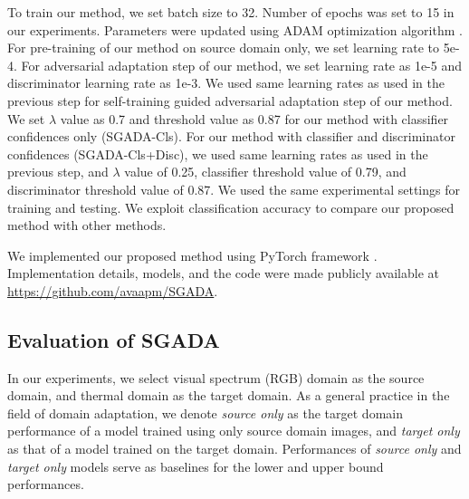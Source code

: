 \documentclass[final]{cvpr}
\begin{document}
To train our method, we set batch size to 32. Number of epochs was set to 15 in our experiments. Parameters were updated using ADAM optimization algorithm \cite{adam}. For pre-training of our method on source domain only, we set learning rate to 5e-4. For adversarial adaptation step of our method, we set learning rate as 1e-5 and discriminator learning rate as 1e-3. We used same learning rates as used in the previous step for self-training guided adversarial adaptation step of our method. We set $ \lambda $ value as 0.7 and threshold value as 0.87 for our method with classifier confidences only (SGADA-Cls). For our method with classifier and discriminator confidences (SGADA-Cls+Disc), we used same learning rates as used in the previous step, and $ \lambda $ value of 0.25, classifier threshold value of 0.79, and discriminator threshold value of 0.87. We used the same experimental settings for training and testing. We exploit classification accuracy to compare our proposed method with other methods.
\vspace{2mm}

We implemented our proposed method using PyTorch framework \cite{pytorch}. Implementation details, models, and the code were made publicly available at \href{https://github.com/avaapm/SGADA}{https://github.com/avaapm/SGADA}.

\subsection{Evaluation of SGADA}

In our experiments, we select visual spectrum (RGB) domain as the source domain, and thermal domain as the target domain. As a general practice in the field of domain adaptation, we denote \textit{source only} as the target domain performance of a model trained using only source domain images, and \textit{target only} as that of a model trained on the target domain. Performances of \textit{source only} and \textit{target only} models serve as baselines for the lower and upper bound performances.
\end{document}
